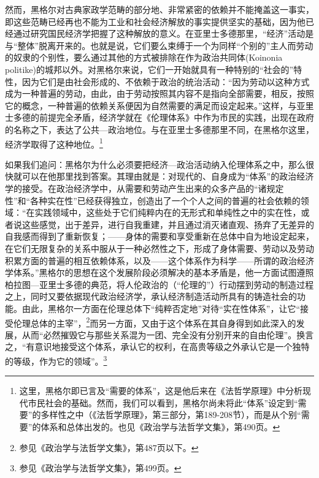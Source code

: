 然而，黑格尔对古典家政学范畴的部分地、非常紧密的依赖并不能掩盖这一事实，即这些范畴已经再也不能为工业和社会经济解放的事实提供坚实的基础，因为他已经通过研究国民经济学把握了这种解放的意义。在亚里士多德那里，“经济”活动是与“整体”脱离开来的。也就是说，它们要么束缚于一个为同样“个别的”主人而劳动的奴隶的个别性，要么通过其他的方式被排除在作为政治共同体(Koinonia politike)的城邦以外。对黑格尔来说，它们一开始就具有一种特别的“社会的”特性，因为它们是由社会形成的、不依赖于政治的统治活动：“因为劳动以这种方式成为一种普遍的劳动，由此，由于劳动按照其内容不是指向全部需要，相反，按照它的概念，一种普遍的依赖关系便因为自然需要的满足而设定起来。”这样，与亚里士多德的前提完全矛盾，经济学就在《伦理体系》中作为市民的实践，出现在政府的名称之下，表达了公共—政治地位。与在亚里士多德那里不同，在黑格尔这里，经济学取得了这种地位。\footnote{这里，黑格尔即已言及“需要的体系”，这是他后来在《法哲学原理》中分析现代市民社会的基础。然而，我们可以看到，黑格尔尚未将此“体系”设定到“需要”的多样性之中（《法哲学原理》，第三部分，第189-208节），而是从个别“需要”的体系和总体出发的。也见《政治学与法哲学文集》，第490页。}

如果我们追问：黑格尔为什么必须要把经济—政治活动纳入伦理体系之中，那么很快就可以在他那里找到答案。其理由就是：对现代的、自身成为“体系”的政治经济学的接受。在政治经济学中，从需要和劳动产生出来的众多产品的“诸规定性”和“各种实在性”已经获得独立，创造出了一个个人之间的普遍的社会依赖的领域：“在实践领域中，这些处于它们纯粹内在的无形式和单纯性之中的实在性，或者说这些感觉，出于差异，进行自我重建，并且通过消灭诸直观、扬弃了无差异的自我感而得到了重新恢复；——身体的需要和享受重新在总体中自为地设定起来，在它们无限复杂的关系中服从于一种必然性之下，形成了身体需要、劳动以及劳动积累方面的普遍的相互依赖体系，以及——这个体系作为科学——所谓的政治经济学体系。”黑格尔的思想在这个发展阶段必须解决的基本矛盾是，他一方面试图遵照柏拉图—亚里士多德的典范，将人伦政治的（“伦理的”）行动摆到劳动的制造过程之上，同时又要依据现代政治经济学，承认经济制造活动所具有的铸造社会的功能。由此，黑格尔一方面在伦理总体下“纯粹否定地”对待“实在性体系”，让它“接受伦理总体的主宰”，\footnote{参见《政治学与法哲学文集》，第487页以下。}而另一方面，又由于这个体系在其自身得到如此深入的发展，从而“必然摧毁它与那些关系混为一团、完全没有分别开来的自由伦理”。换言之，“有意识地接受这个体系，承认它的权利，在高贵等级之外承认它是一个独特的等级，作为它的领域”。\footnote{参见《政治学与法哲学文集》，第499页。}

